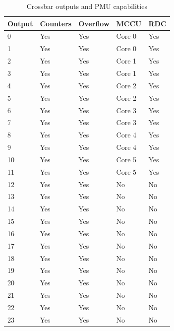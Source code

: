 \begin{table}
	\caption{Crossbar outputs and PMU capabilities}
	\label{tab:features}
\begin{small}
	\begin{center} 
		\begin{tabular}{|l|l|l|l|l|}
			\hline
			\textbf{Output} & \textbf{Counters} & \textbf{Overflow}  & \textbf{MCCU}  & \textbf{RDC}\\
			\hline
			0 & Yes & Yes & Core 0 & Yes \\
			\hline
			1 & Yes & Yes & Core 0 & Yes \\
			\hline
			2 & Yes & Yes & Core 1 & Yes \\
			\hline
			3 & Yes & Yes & Core 1 & Yes \\
			\hline
			4 & Yes & Yes & Core 2 & Yes \\
			\hline
			5 & Yes & Yes & Core 2 & Yes \\
			\hline
			6 & Yes & Yes & Core 3 & Yes \\
			\hline
			7 & Yes & Yes & Core 3 & Yes \\
			\hline
			8 & Yes & Yes & Core 4 & Yes \\
			\hline
			9 & Yes & Yes & Core 4 & Yes \\
			\hline
			10 & Yes & Yes & Core 5 & Yes \\
			\hline
			11 & Yes & Yes & Core 5 & Yes\\
			\hline
			12 & Yes & Yes & No & No \\
			\hline
			13 & Yes & Yes & No & No \\
			\hline
			14 & Yes & Yes & No & No \\
			\hline
			15 & Yes & Yes & No & No \\
			\hline
			16 & Yes & Yes & No & No \\
			\hline
			17 & Yes & Yes & No & No \\
			\hline
			18 & Yes & Yes & No & No \\
			\hline
			19 & Yes & Yes & No & No \\
			\hline
			20 & Yes & Yes & No & No \\
			\hline
			21 & Yes & Yes & No & No \\
			\hline
			22 & Yes & Yes & No & No \\
			\hline
			23 & Yes & Yes & No & No \\
			\hline
		\end{tabular}
	\end{center}
\end{small}
\end{table}

